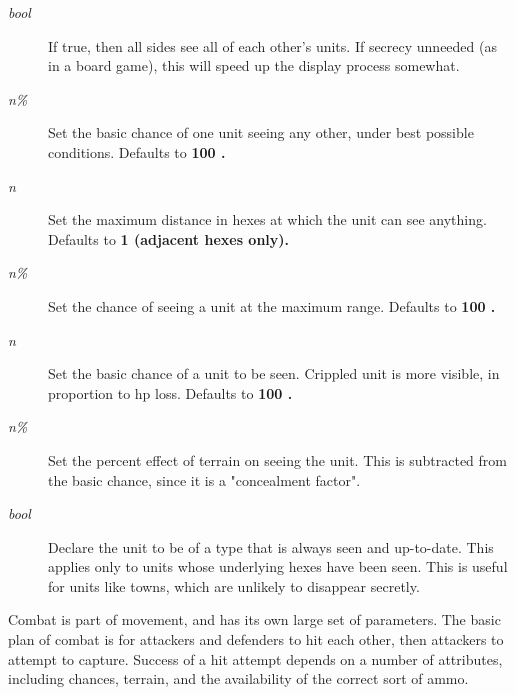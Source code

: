 \begin{description}
\item[{%
\it bool}]
If true, then all sides see all of each other's units.  If secrecy unneeded
(as in a board game), this will speed up the display process somewhat.
\item[{%
\it n\%}]
Set the basic chance of one unit seeing any other,
under best possible conditions.  Defaults to %
\bf 100\rm%
.
\item[{%
\it n}]
Set the maximum distance in hexes at which the unit can see anything.
Defaults to %
\bf 1 \rm%
(adjacent hexes only).
\item[{%
\it n\%}]
Set the chance of seeing a unit at the maximum range.
Defaults to %
\bf 100\rm%
.
\item[{%
\it n}]
Set the basic chance of a unit to be seen.
Crippled unit is more visible, in proportion to hp loss.
Defaults to %
\bf 100\rm%
.
\item[{%
\it n\%}]
Set the percent effect of terrain on seeing the unit.  This is subtracted
from the basic chance, since it is a "concealment factor".
\item[{%
\it bool}]
Declare the unit to be of a type that is always seen and up-to-date.
This applies only to units whose underlying hexes have been seen.
This is useful for units like towns,
which are unlikely to disappear secretly.
\end{description}\par\noindent
Combat is part of movement, and has its own large set of parameters.
The basic plan of combat is for attackers and defenders to hit each other,
then attackers to attempt to capture.
Success of a hit attempt depends on a number of attributes, including
chances, terrain, and the availability of the correct sort of ammo.
